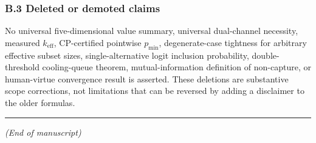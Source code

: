 \documentclass[
  11pt]{article}
\begin{document}
\subsubsection{B.3 Deleted or demoted
claims}\label{b.3-deleted-or-demoted-claims}

No universal five-dimensional value summary, universal dual-channel
necessity, measured \(k_{\mathrm{eff}}\), CP-certified pointwise
\(p_{\min}\), degenerate-case tightness for arbitrary effective subset
sizes, single-alternative logit inclusion probability, double-threshold
cooling-queue theorem, mutual-information definition of non-capture, or
human-virtue convergence result is asserted. These deletions are
substantive scope corrections, not limitations that can be reversed by
adding a disclaimer to the older formulas.

\begin{center}\rule{0.5\linewidth}{0.5pt}\end{center}

\emph{(End of manuscript)}
\end{document}

